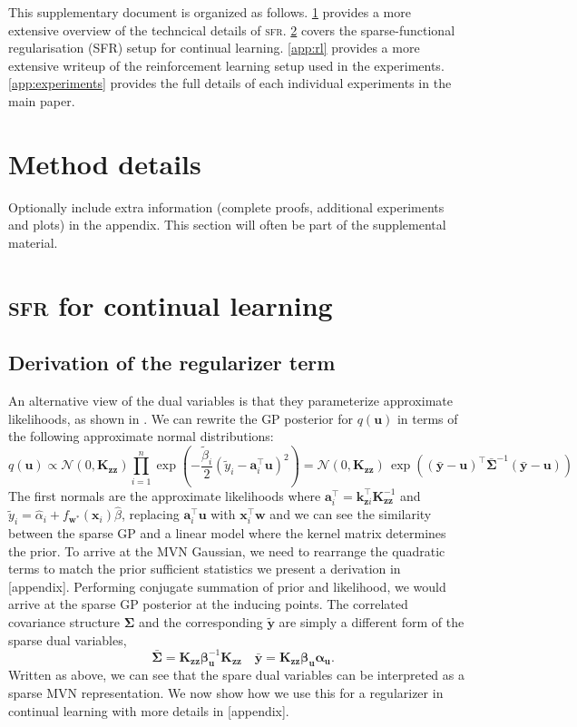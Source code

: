 \documentclass{article}
\newcommand{\our}{\textsc{sfr}\xspace}
\newcommand{\mathbold}[1]{\bm{#1}}
\newcommand{\mbf}[1]{\mathbf{#1}}
\newcommand{\valpha}[0]{\mathbold{\alpha}}
\newcommand{\vbeta}[0]{\mathbold{\beta}}
\newcommand{\vu}{\mbf{u}}
\newcommand{\vx}{\mbf{x}}
\newcommand{\vy}{\mbf{y}}
\newcommand{\vw}{\mbf{w}}
\newcommand{\va}{\mbf{a}}
\newcommand{\MKzz}{\mbf{K}_{\mbf{z}\mbf{z}}}
\newcommand{\vkzi}{\mbf{k}_{\mbf{z}i}}
\newcommand{\MSigma}[0]{\mathbold{\Sigma}}
\newcommand{\Norm}{\mathcal{N}}
\begin{document}
\appendix

This supplementary document is organized as follows. 
%
\cref{app:method} provides a more extensive overview of the techncical details of \our.
%
\cref{app:cl} covers the sparse-functional regularisation (SFR) setup for continual learning.
%
\cref{app:rl} provides a more extensive writeup of the reinforcement learning setup used in the experiments.
%
\cref{app:experiments} provides the full details of each individual experiments in the main paper.


\section{Method details}
\label{app:method}
%
Optionally include extra information (complete proofs, additional experiments and plots) in the appendix.
This section will often be part of the supplemental material.



\section{\our for continual learning}
\label{app:cl}
\subsection{Derivation of the regularizer term}
An alternative view of the dual variables is that they parameterize approximate likelihoods, as shown in \citep{adam2021dual, khan2017conjugate}. We can rewrite the GP posterior for $q(\vu)$ in terms of the following approximate normal distributions:
\begin{equation}
 q(\vu) \propto \Norm(0, \MKzz) \prod_{i=1}^n \exp \! \left(-\frac{\tilde{\beta}_i}{2}(\tilde{y}_i - \va_i^\top \vu)^2 \right) = \Norm(0, \MKzz) \, \exp\left((\bar{\vy} - \vu)^\top \bar{\MSigma}^{-1}(\bar{\vy} - \vu)\right)  
\end{equation}
The first normals are the approximate likelihoods where $\va_i^\top = \vkzi^\top \MKzz^{-1}$ and $\tilde{y}_i = \hat{\alpha}_i + f_{\vw^*}(\vx_i)\hat{\beta}$,  replacing $\va_i^\top \vu$ with $\vx_i^{\top}\vw$ and we can see the similarity between the sparse GP and a linear model where the kernel matrix determines the prior. To arrive at the MVN Gaussian, we need to rearrange the quadratic terms to match the prior sufficient statistics we present a derivation in [appendix]. Performing conjugate summation of prior and likelihood, we would arrive at the sparse GP posterior at the inducing points. The correlated covariance structure $\MSigma$ and the corresponding $\tilde{\vy}$ are simply a different form of the sparse dual variables,
\begin{equation}
\quad \bar{\MSigma} =  \MKzz \vbeta_\vu^{-1} \MKzz \quad \bar{\vy} = \MKzz \vbeta_{\vu}\valpha_{\vu}.
\end{equation}
Written as above, we can see that the spare dual variables can be interpreted as a sparse MVN representation. We now show how we use this for a regularizer in continual learning with more details in [appendix].
\end{document}
